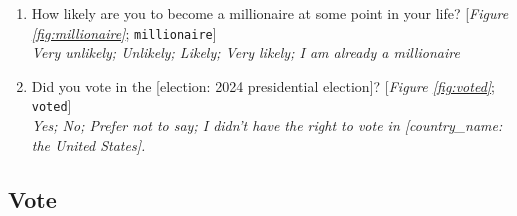 \begin{enumerate}[resume]
\item  \label{q:millionaire} How likely are you to become a millionaire at some point in your life? [\textit{Figure \ref{fig:millionaire}}; 
\verb|millionaire|]
  \\ \textit{Very unlikely; Unlikely; Likely; Very likely; I am already a millionaire}

\item  \label{q:voted} Did you vote in the [election: 2024 presidential election]? [\textit{Figure \ref{fig:voted}}; 
\verb|voted|]
  \\ \textit{Yes; No; Prefer not to say; I didn't have the right to vote in [country\_name: the United States].}

\end{enumerate} 

 \subsection*{Vote} 
